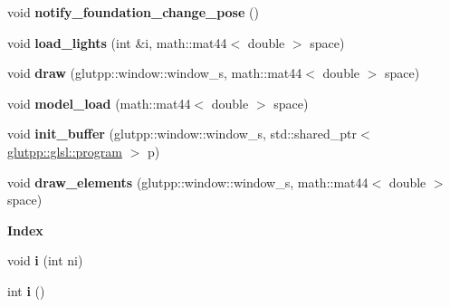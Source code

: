 \begin{DoxyCompactItemize}
\item 
\hypertarget{classglutpp_1_1shape_1_1shape_ab30cd62c6b82b7554c75c888128af643}{void {\bfseries notify\-\_\-foundation\-\_\-change\-\_\-pose} ()}\label{classglutpp_1_1shape_1_1shape_ab30cd62c6b82b7554c75c888128af643}

\item 
\hypertarget{classglutpp_1_1shape_1_1shape_a507aa22dd5afc70313f3787743d64ccc}{void {\bfseries load\-\_\-lights} (int \&i, math\-::mat44$<$ double $>$ space)}\label{classglutpp_1_1shape_1_1shape_a507aa22dd5afc70313f3787743d64ccc}

\item 
\hypertarget{classglutpp_1_1shape_1_1shape_a7b225fdba653c5d0a392518805bf443c}{void {\bfseries draw} (glutpp\-::window\-::window\-\_\-s, math\-::mat44$<$ double $>$ space)}\label{classglutpp_1_1shape_1_1shape_a7b225fdba653c5d0a392518805bf443c}

\item 
\hypertarget{classglutpp_1_1shape_1_1shape_a2c91a38dac528c55e364333a99c01b60}{void {\bfseries model\-\_\-load} (math\-::mat44$<$ double $>$ space)}\label{classglutpp_1_1shape_1_1shape_a2c91a38dac528c55e364333a99c01b60}

\item 
\hypertarget{classglutpp_1_1shape_1_1shape_a892f5bc48dc85c0e563d3a2d36d0a6a7}{void {\bfseries init\-\_\-buffer} (glutpp\-::window\-::window\-\_\-s, std\-::shared\-\_\-ptr$<$ \hyperlink{classglutpp_1_1glsl_1_1program}{glutpp\-::glsl\-::program} $>$ p)}\label{classglutpp_1_1shape_1_1shape_a892f5bc48dc85c0e563d3a2d36d0a6a7}

\item 
\hypertarget{classglutpp_1_1shape_1_1shape_aec9ad2b2ea72f384a4db87facbfacbbb}{void {\bfseries draw\-\_\-elements} (glutpp\-::window\-::window\-\_\-s, math\-::mat44$<$ double $>$ space)}\label{classglutpp_1_1shape_1_1shape_aec9ad2b2ea72f384a4db87facbfacbbb}

\end{DoxyCompactItemize}
\begin{Indent}{\bf \-Index}\par
\begin{DoxyCompactItemize}
\item 
\hypertarget{classglutpp_1_1shape_1_1shape_a691317aef9c651b798d5a9665a870951}{void {\bfseries i} (int ni)}\label{classglutpp_1_1shape_1_1shape_a691317aef9c651b798d5a9665a870951}

\item 
\hypertarget{classglutpp_1_1shape_1_1shape_a517cac7ef31a24c2d01161d4db27efbb}{int {\bfseries i} ()}\label{classglutpp_1_1shape_1_1shape_a517cac7ef31a24c2d01161d4db27efbb}

\end{DoxyCompactItemize}
\end{Indent}
